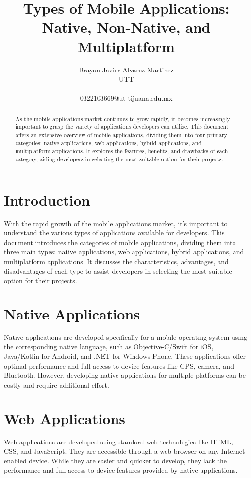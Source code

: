 \documentclass{IEEEtran}
\begin{document}
\title{Types of Mobile Applications: Native, Non-Native, and Multiplatform}
\author{Brayan Javier Alvarez Martinez \\
UTT \\
\\0322103669@ut-tijuana.edu.mx}
\maketitle

\begin{abstract}
As the mobile applications market continues to grow rapidly, it becomes increasingly important to grasp the variety of applications developers can utilize. This document offers an extensive overview of mobile applications, dividing them into four primary categories: native applications, web applications, hybrid applications, and multiplatform applications. It explores the features, benefits, and drawbacks of each category, aiding developers in selecting the most suitable option for their projects.
\end{abstract}

\section{Introduction}
With the rapid growth of the mobile applications market, it's important to understand the various types of applications available for developers. This document introduces the categories of mobile applications, dividing them into three main types: native applications, web applications, hybrid applications, and multiplatform applications. It discusses the characteristics, advantages, and disadvantages of each type to assist developers in selecting the most suitable option for their projects.

\section{Native Applications}
Native applications are developed specifically for a mobile operating system using the corresponding native language, such as Objective-C/Swift for iOS, Java/Kotlin for Android, and .NET for Windows Phone. These applications offer optimal performance and full access to device features like GPS, camera, and Bluetooth. However, developing native applications for multiple platforms can be costly and require additional effort.

\section{Web Applications}
Web applications are developed using standard web technologies like HTML, CSS, and JavaScript. They are accessible through a web browser on any Internet-enabled device. While they are easier and quicker to develop, they lack the performance and full access to device features provided by native applications.
\end{document}
